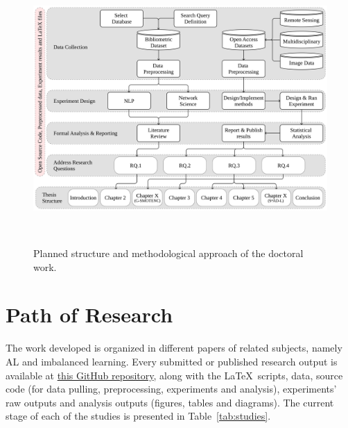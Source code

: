 \begin{figure}[ht]
	\centering
    \includegraphics[width=\linewidth]{phd_structure}
    \caption{Planned structure and methodological approach of the doctoral work.
    }~\label{fig:phd_structure}
\end{figure}



\section{Path of Research}

The work developed is organized in different papers of related subjects,
namely AL and imbalanced learning. Every submitted or published research
output is available at
\href{https://github.com/joaopfonseca/publications}{this GitHub repository},
along with the \LaTeX\ scripts, data, source code (for data pulling,
preprocessing, experiments and analysis), experiments' raw outputs and
analysis outputs (figures, tables and diagrams). The current stage of each of
the studies is presented in Table~\ref{tab:studies}.

